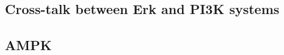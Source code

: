 \documentclass{article}
\begin{document}
    \subsection{Cross-talk between Erk and PI3K systems}

    \subsection{AMPK}

\end{document}
